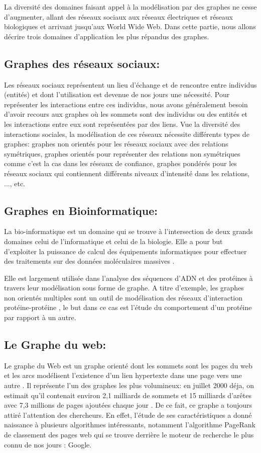   La diversité des domaines faisant appel à la modélisation par des graphes ne cesse d'augmenter, allant des réseaux sociaux aux réseaux électriques et réseaux biologiques et arrivant jusqu'aux World Wide Web. Dans cette partie, nous allons décrire trois domaines d'application les plus répandus des graphes.
	
		\subsection{Graphes des réseaux sociaux:}
		Les réseaux sociaux représentent un lieu d'échange et de rencontre entre individus (entités) et dont l'utilisation est devenue de nos jours une nécessité.  
		Pour représenter les interactions entre ces individus, nous avons généralement besoin d'avoir recours aux graphes où les sommets sont des individus ou des entités et les interactions entre eux sont représentées par des liens. 
		Vue la diversité des interactions sociales, la modélisation de ces réseaux nécessite différents types de graphes: graphes non orientés pour les réseaux sociaux avec des relations  symétriques, graphes orientés pour représenter des relations non symétriques
comme c'est la cas dans les réseaux de confiance, graphes pondérés pour les réseaux sociaux qui contiennent différents niveaux d'intensité dans les relations, ..., etc. \citep{lemmouchi2012etude}
		
		\subsection{Graphes en Bioinformatique:}
		
		La bio-informatique est un domaine qui se trouve à l'intersection de deux grands domaines celui de l'informatique et celui de la biologie. Elle a pour but d'exploiter la puissance de calcul des équipements informatiques pour effectuer des traitements sur des données moléculaires massives \citep{pellegrini2004protein}.
		
		Elle est largement utilisée dans l’analyse des séquences d’ADN et des protéines à travers leur modélisation sous forme de graphe. A titre d'exemple, les graphes non orientés multiples sont un outil de modélisation des réseaux d’interaction protéine-protéine \citep{pellegrini2004protein}, 
		le but dans ce cas est l'étude du comportement d'un protéine par rapport à un autre.
		
		\subsection{Le Graphe du web:}
		 Le graphe du Web est un graphe orienté dont les sommets sont les pages du web et les arcs modélisent l'existence d'un lien hypertexte dans une page vers une autre \citep{brisaboa2009k}. Il représente l'un des graphes les plus volumineux: en juillet 2000 déja, on estimait qu’il contenait environ 2,1 milliards de sommets et 15 milliards d’arêtes avec 7,3 millions de pages ajoutées chaque jour \citep{guillaume2002web}. De ce fait, ce graphe a toujours attiré l'attention des chercheurs. En effet, l'étude de ses caractéristiques a donné naissance à plusieurs algorithmes intéressants, notamment l'algorithme PageRank de classement des pages web qui se trouve derrière le moteur de recherche le plus connu de nos jours : Google.